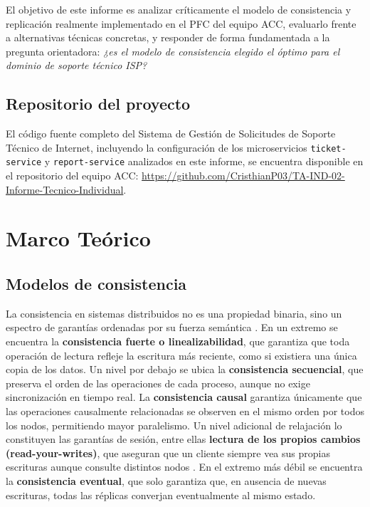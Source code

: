 \documentclass[12pt, a4paper]{article}
\begin{document}
El objetivo de este informe es analizar críticamente el modelo de consistencia y replicación realmente implementado en el PFC del equipo ACC, evaluarlo frente a alternativas técnicas concretas, y responder de forma fundamentada a la pregunta orientadora: \textit{¿es el modelo de consistencia elegido el óptimo para el dominio de soporte técnico ISP?}
\newpage
\subsection{Repositorio del proyecto}
El código fuente completo del Sistema de Gestión de Solicitudes de Soporte Técnico de Internet, incluyendo la configuración de los microservicios \texttt{ticket-service} y \texttt{report-service} analizados en este informe, se encuentra disponible en el repositorio del equipo ACC: \url{https://github.com/CristhianP03/TA-IND-02-Informe-Tecnico-Individual}.

\section{Marco Teórico}

\subsection{Modelos de consistencia}
La consistencia en sistemas distribuidos no es una propiedad binaria, sino un espectro de garantías ordenadas por su fuerza semántica \cite{viottivukolic2016}. En un extremo se encuentra la \textbf{consistencia fuerte o linealizabilidad}, que garantiza que toda operación de lectura refleje la escritura más reciente, como si existiera una única copia de los datos. Un nivel por debajo se ubica la \textbf{consistencia secuencial}, que preserva el orden de las operaciones de cada proceso, aunque no exige sincronización en tiempo real. La \textbf{consistencia causal} garantiza únicamente que las operaciones causalmente relacionadas se observen en el mismo orden por todos los nodos, permitiendo mayor paralelismo. Un nivel adicional de relajación lo constituyen las garantías de sesión, entre ellas \textbf{lectura de los propios cambios (read-your-writes)}, que aseguran que un cliente siempre vea sus propias escrituras aunque consulte distintos nodos \cite{terry1994}. En el extremo más débil se encuentra la \textbf{consistencia eventual}, que solo garantiza que, en ausencia de nuevas escrituras, todas las réplicas converjan eventualmente al mismo estado.
\end{document}
